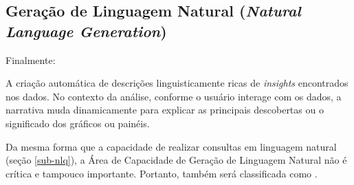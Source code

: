 \subsection{Geração de Linguagem Natural (\emph{Natural Language Generation})}
\label{sub-nlg}

Finalmente:

\begin{definition}
A criação automática de descrições linguisticamente ricas de \emph{insights} encontrados nos dados. No contexto da análise, conforme o usuário interage com os dados, a narrativa muda dinamicamente para explicar as principais descobertas ou o significado dos gráficos ou painéis.
\end{definition}


Da mesma forma que a capacidade de realizar consultas em linguagem natural (seção \ref{sub-nlq}), a Área de Capacidade de Geração de Linguagem Natural não é crítica e tampouco importante. Portanto, também será classificada como \WOULD.